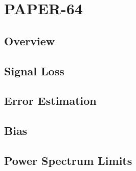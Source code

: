 \chapter{PAPER-64}
\label{c.PSA64}


\section{Overview}
\label{sec:PSA64overview}


\section{Signal Loss}

\section{Error Estimation}

\section{Bias}

\section{Power Spectrum Limits}






